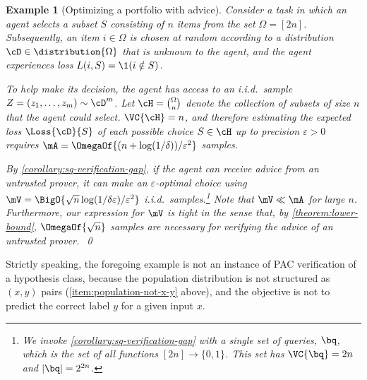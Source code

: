 \documentclass[11pt]{article}
\newtheorem{example}[theorem]{Example}
\begin{document}
\begin{example}[Optimizing a portfolio with advice]
	Consider a task in which an agent selects a subset $S$ consisting of $n$ items from the set $\Omega = [2n]$. Subsequently, an item $i \in \Omega$ is chosen at random according to a distribution $\cD \in \distribution{\Omega}$ that is unknown to the agent, and the agent experiences loss $L(i,S) = \1(i \notin S)$.
	
	To help make its decision, the agent has access to an i.i.d.\ sample $Z = (z_1,\dots,z_m) \sim \cD^m$. Let $\cH = \binom{\Omega}{n}$ denote the collection of subsets of size $n$ that the agent could select. $\VC{\cH} = n$, and therefore estimating the expected loss $\Loss{\cD}{S}$ of each possible choice $S \in \cH$ up to precision $\varepsilon > 0$ requires $\mA = \OmegaOf{(n + \log(1/\delta))/\varepsilon^2}$ samples.
	
	By \cref{corollary:sq-verification-gap}, if the agent can receive advice from an untrusted prover, it can make an $\varepsilon$-optimal choice using $\mV = \BigO{\sqrt{n}\log(1/\delta\varepsilon)/\varepsilon^2}$ i.i.d.\ samples.\footnote{%
		We invoke \cref{corollary:sq-verification-gap} with a single set of queries, $\bq$, which is the set of all functions $[2n] \to \{0,1\}$. This set has $\VC{\bq} = 2n$ and $|\bq| = 2^{2n}$.
	} Note that $\mV \ll \mA$ for large $n$. Furthermore, our expression for $\mV$ is tight in the sense that, by \cref{theorem:lower-bound}, $\OmegaOf{\sqrt{n}}$ samples are necessary for verifying the advice of an untrusted prover.~\qed
\end{example}

Strictly speaking, the foregoing example is not an instance of PAC verification of a hypothesis class, because the population distribution is not structured as $(x,y)$ pairs (\cref{item:population-not-x-y} above), and the objective is not to predict the correct label $y$ for a given input $x$. 
\end{document}
